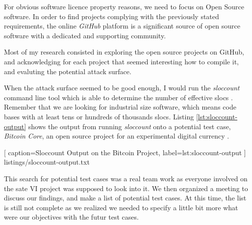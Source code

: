 \vspace{0.5cm}

For obvious software licence property reasons, we need to focus on Open Source software. In order to find projects complying with the previously stated requirements, the online \emph{GitHub} platform is a significant source of open source software with a dedicated and supporting community.

\vspace{0.4cm}

Most of my research consisted in exploring the open source projects on GitHub, and acknowledging for each project that seemed interesting how to compile it, and evaluting the potential attack surface.

\vspace{0.4cm}

When the attack surface seemed to be good enough, I would run the \emph{sloccount} command line tool which is able to determine the number of effective \glspl{sloc} \cite{wheeler2016sloccount}. Remember that we are looking for industrial size software, which means code bases with at least tens or hundreds of thousands \glspl{sloc}. Listing \ref{lst:sloccount-output} shows the output from running \emph{sloccount} onto a potential test case, \emph{Bitcoin Core}, an open source project for an experimental digital currency \cite{bitcoin2016github}.

\vspace{1cm}


    [
        caption=Sloccount Output on the Bitcoin Project,
        label=lst:sloccount-output
    ]
    {listings/sloccount-output.txt}

This search for potential test cases was a real team work as everyone involved on the \gls{sate} VI project was supposed to look into it. We then organized a meeting to discuss our findings, and make a list of potential test cases. At this time, the list is still not complete as we realized we needed to specify a little bit more what were our objectives with the futur test cases.
